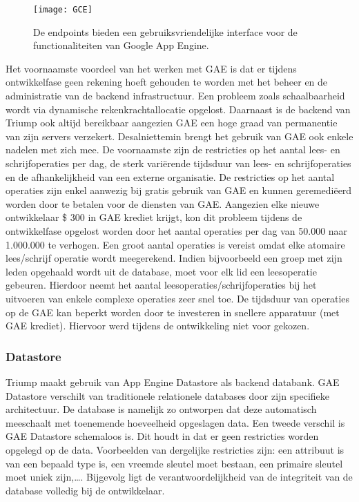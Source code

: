 \begin{figure}[H]
	\centering
	\texttt{[image: GCE]}
	\caption{De endpoints  bieden een gebruiksvriendelijke interface voor de functionaliteiten van Google App Engine.}
	\label{fig:Overzicht Google Cloud Endpoints}
\end{figure}

Het voornaamste voordeel van het werken met GAE is dat er tijdens ontwikkelfase geen rekening hoeft gehouden te worden met het  beheer en de administratie van de backend infrastructuur. Een probleem zoals schaalbaarheid wordt via dynamische rekenkrachtallocatie opgelost. Daarnaast is de backend van Triump ook altijd bereikbaar aangezien GAE een hoge graad van permanentie van zijn servers verzekert. Desalniettemin brengt het gebruik van GAE ook enkele nadelen met zich mee. De voornaamste zijn de restricties op het aantal lees- en schrijfoperaties per dag, de sterk variërende tijdsduur van lees- en schrijfoperaties en de afhankelijkheid van een externe organisatie. De restricties op het aantal operaties zijn enkel aanwezig bij gratis gebruik van GAE en kunnen geremediëerd worden door te betalen voor de diensten van GAE.
Aangezien elke nieuwe ontwikkelaar \$ 300 in GAE krediet krijgt, kon dit probleem tijdens de ontwikkelfase opgelost worden door het aantal operaties per dag van 50.000 naar 1.000.000 te verhogen. Een groot aantal operaties is vereist omdat elke atomaire lees/schrijf operatie wordt meegerekend. Indien bijvoorbeeld een groep met zijn leden opgehaald wordt uit de database, moet voor elk lid een leesoperatie gebeuren. Hierdoor neemt het aantal leesoperaties/schrijfoperaties bij het uitvoeren van enkele complexe operaties zeer snel toe. De tijdsduur van operaties op de GAE kan beperkt worden door te investeren in snellere apparatuur (met GAE krediet). Hiervoor werd tijdens de ontwikkeling niet voor gekozen.

\subsubsection{Datastore~\cite{Google_Datastore}}

Triump maakt gebruik van App Engine Datastore als backend databank. GAE Datastore verschilt van traditionele relationele databases door zijn specifieke architectuur. De database is namelijk zo ontworpen dat deze automatisch meeschaalt met toenemende hoeveelheid opgeslagen data. Een tweede verschil is GAE Datastore schemaloos is. Dit houdt in dat er geen restricties worden opgelegd op de data. Voorbeelden van dergelijke restricties zijn: een attribuut is van een bepaald type is, een vreemde sleutel moet bestaan, een primaire sleutel moet uniek zijn,\ldots. Bijgevolg ligt de verantwoordelijkheid van de integriteit van de database volledig bij de ontwikkelaar.

